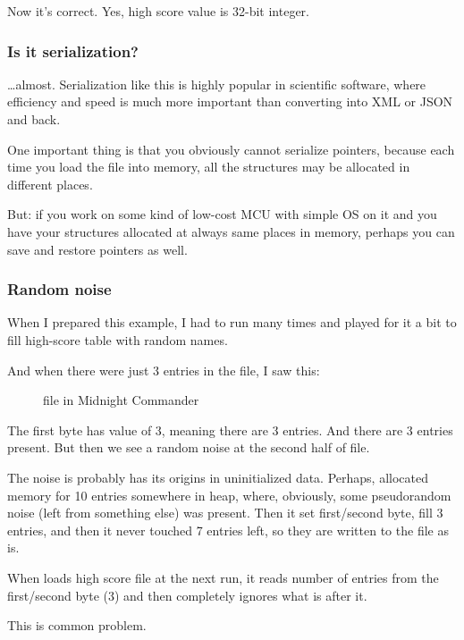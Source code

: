 Now it's correct. Yes, high score value is 32-bit integer.

\subsubsection{Is it serialization?}

\dots almost.
Serialization like this is highly popular in scientific software, where efficiency and speed is much more important
than converting into \ac{XML} or \ac{JSON} and back.

One important thing is that you obviously cannot serialize pointers, because each time you load the file into memory,
all the structures may be allocated in different places.

But: if you work on some kind of low-cost \ac{MCU} with simple \ac{OS} on it
and you have your structures allocated at always same
places in memory, perhaps you can save and restore pointers as well.

\subsubsection{Random noise}

When I prepared this example, I had to run  many times and played for it a bit
to fill high-score table with random names.

And when there were just 3 entries in the file, I saw this:

\begin{figure}[H]
\centering
{}
\caption{ file in Midnight Commander}
\end{figure}

The first byte has value of 3, meaning there are 3 entries.
And there are 3 entries present.
But then we see a random noise at the second half of file.

The noise is probably has its origins in uninitialized data.
Perhaps,  allocated memory for 10 entries somewhere in heap, where, obviously,
some pseudorandom noise (left from something else) was present.
Then it set first/second byte, fill 3 entries, and then it never touched 7 entries left, so they are written
to the file as is.

When  loads high score file at the next run, it reads number of entries from the first/second byte (3) and
then completely ignores what is after it.

This is common problem.

